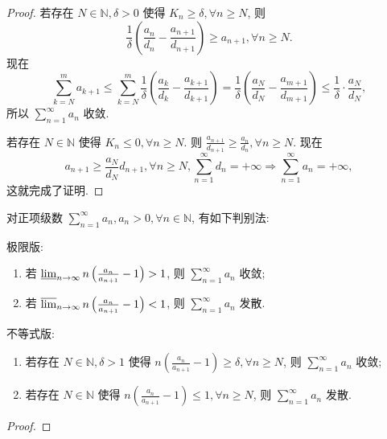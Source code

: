 \documentclass[../../main.tex]{subfiles}%
\begin{document}
\begin{proof}
若存在 \( N \in \mathbb{N}, \delta > 0 \) 使得 \( K_n \geqslant \delta, \forall n \geqslant N \), 则
\[
\frac{1}{\delta} \left( \frac{a_n}{d_n} - \frac{a_{n + 1}}{d_{n + 1}} \right) \geqslant a_{n + 1}, \forall n \geqslant N.
\]
现在
\[
\sum_{k=N}^m a_{k + 1} \leqslant \sum_{k=N}^m \frac{1}{\delta} \left( \frac{a_k}{d_k} - \frac{a_{k + 1}}{d_{k + 1}} \right) = \frac{1}{\delta} \left( \frac{a_N}{d_N} - \frac{a_{m + 1}}{d_{m + 1}} \right) \leqslant \frac{1}{\delta} \cdot \frac{a_N}{d_N},
\]
所以 \( \sum_{n=1}^\infty a_n \) 收敛.

若存在 \( N \in \mathbb{N} \) 使得 \( K_n \leqslant 0, \forall n \geqslant N \). 则 \( \frac{a_{n + 1}}{d_{n + 1}} \geqslant \frac{a_n}{d_n}, \forall n \geqslant N \). 现在
\[
a_{n + 1} \geqslant \frac{a_N}{d_N} d_{n + 1}, \forall n \geqslant N, \sum_{n=1}^\infty d_n = +\infty \Rightarrow \sum_{n=1}^\infty a_n = +\infty,
\]
这就完成了证明.
\end{proof}

\begin{theorem}[Raabe判别法]\label{theorem:Raabe(拉比)判别法}
对正项级数 \( \sum_{n=1}^\infty a_n, a_n > 0, \forall n \in \mathbb{N} \), 有如下判别法:

极限版:
\begin{enumerate}
\item 若 \( \varliminf_{n \to \infty} n \left( \frac{a_n}{a_{n + 1}} - 1 \right) > 1 \), 则 \( \sum_{n=1}^\infty a_n \) 收敛;
\item 若 \( \varlimsup_{n \to \infty} n \left( \frac{a_n}{a_{n + 1}} - 1 \right) < 1 \), 则 \( \sum_{n=1}^\infty a_n \) 发散.
\end{enumerate}

不等式版:
\begin{enumerate}
\item 若存在 \( N \in \mathbb{N}, \delta > 1 \) 使得 \( n \left( \frac{a_n}{a_{n + 1}} - 1 \right) \geqslant \delta, \forall n \geqslant N \), 则 \( \sum_{n=1}^\infty a_n \) 收敛;
\item 若存在 \( N \in \mathbb{N} \) 使得 \( n \left( \frac{a_n}{a_{n + 1}} - 1 \right) \leqslant 1, \forall n \geqslant N \), 则 \( \sum_{n=1}^\infty a_n \) 发散.
\end{enumerate}
\end{theorem}
\begin{proof}

\end{proof}
\end{document}
